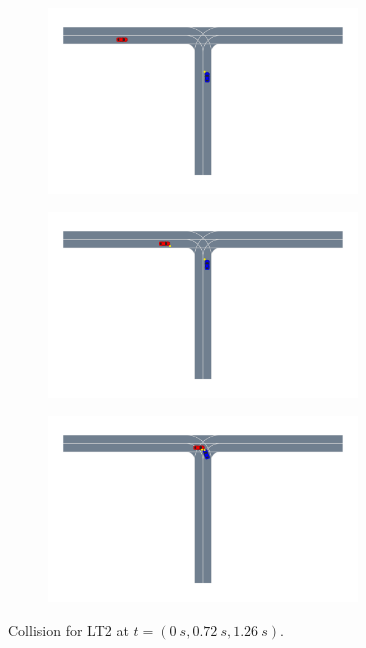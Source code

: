 \begin{figure}
    \centering
    \begin{subfigure}[t]{0.33\columnwidth}
        \centering
        \includegraphics[width=0.9\textwidth, trim={10cm 16.5cm 22cm 0},clip]{figures/interpretable_validation/2car_res2_frame_01.pdf}
    \end{subfigure}%
   \begin{subfigure}[t]{0.33\columnwidth}
        \centering
        \includegraphics[width=0.9\textwidth, trim={10cm 16.5cm 22cm 0},clip]{figures/interpretable_validation/2car_res2_frame_05.pdf}
    \end{subfigure}%
    \begin{subfigure}[t]{0.33\columnwidth}
        \centering
        \includegraphics[width=0.9\textwidth, trim={10cm 16.5cm 22cm 0},clip]{figures/interpretable_validation/2car_res2_frame_08.pdf}
    \end{subfigure}
    \caption{Collision for LT2 at $t=(\SI{0}{s}, \SI{0.72}{s}, \SI{1.26}{s})$.}
    \label{fig:2car_LT2}
    \vskip -0.2in
\end{figure}


